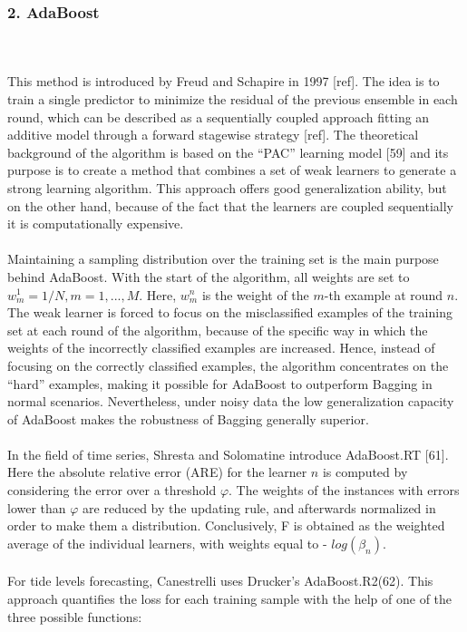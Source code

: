 \documentclass[runningheads,a4paper]{llncs}[2015/06/24]
\begin{document}
\subsubsection{2. AdaBoost}
\hspace{1cm}\\\\This method is introduced by Freud and Schapire in 1997 [ref]. The idea is to train a single predictor to minimize the residual of the previous ensemble in each round, which can be described as a sequentially coupled approach fitting an additive model through a forward stagewise strategy [ref]. The theoretical background of the algorithm is based on the \enquote{PAC} learning model [59] and its purpose is to create a method that combines a set of weak learners to generate a strong learning algorithm. This approach offers good generalization ability, but on the other hand, because of the fact that the learners are coupled sequentially it is computationally expensive. \\\\Maintaining a sampling distribution over the training set is the main purpose behind AdaBoost. With the start of the algorithm, all weights are set to $w^1_m = 1/N, m = 1,..., M$. Here,  $w^n_m$ is the weight of the $m$-th example at round $n$.  The weak learner is forced to focus on the misclassified examples of the training set at each round of the algorithm, because of the specific way in which the weights of the incorrectly classified examples are increased. Hence, instead of focusing on the correctly classified examples, the algorithm concentrates on the \enquote{hard} examples, making it possible for AdaBoost to outperform Bagging in normal scenarios. Nevertheless, under noisy data the low generalization capacity of AdaBoost makes the robustness of Bagging generally superior. \\\\ In the field of time series, Shresta and Solomatine introduce AdaBoost.RT [61]. Here the absolute relative error (ARE) for the learner $n$ is computed by considering the error over a threshold $φ$. The weights of the instances with errors lower than $φ$ are reduced by the updating rule, and afterwards normalized in order to make them a distribution. Conclusively, F is obtained as the weighted average of the individual learners, with weights equal to - $log(β_n)$. \\\\For tide levels forecasting, Canestrelli uses Drucker's AdaBoost.R2(62).  This approach quantifies the loss for each training sample with the help of one of the three possible functions: 
\end{document}
